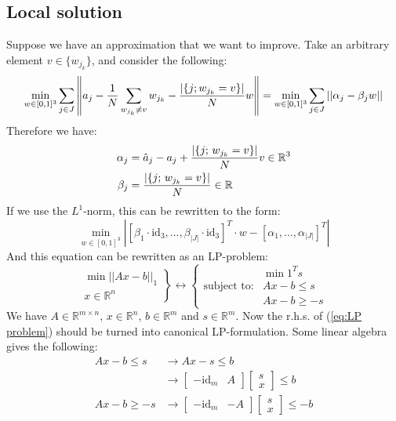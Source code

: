 \documentclass[10pt,a4paper]{article}
\newcommand{\R}{\mathbb{R}}
\newcommand{\id}{\text{id}}
\begin{document}
	\subsection*{Local solution}
	Suppose we have an approximation that we want to improve.
	Take an arbitrary element $v \in \{ w_{j_k} \}$, and consider the following:
	\begin{equation*}
	\min_{w \in [0,1]^3} \sum_{j \in J} \left\lVert a_j - {1 \over N} \sum_{w_{j_k} \neq v} w_{j_k} - {|\{j; w_{j_k} = v\}| \over N} w \right\rVert = \min_{w \in [0,1]^3} \sum_{j \in J} ||\alpha_j - \beta_j w||
	\end{equation*}
	Therefore we have:
	\begin{align*}
	\alpha_j &= \hat{a}_j - a_j + {|\{j; \, w_{j_k} = v \}| \over N}v \in \R^3\\
	\beta_j &= {|\{j; \, w_{j_k} = v \}| \over N} \in \R
	\end{align*}
	If we use the $L^1$-norm, this can be rewritten to the form:
	\begin{equation*}
	\min_{w \in [0,1]^3} |[\beta_1 \cdot \id_{3}, ..., \beta_{|J|} \cdot \id_{3}]^T \cdot w - [\alpha_1, ..., \alpha_{|J|}]^T|
	\end{equation*}
	And this equation can be rewritten as an LP-problem:
	\begin{equation}
	\left. \begin{matrix}
	\min ||Ax - b||_1\\
	x \in \R^n
	\end{matrix} \right\} 
	\longleftrightarrow 
	\left\{ \begin{matrix}
	&\min 1^T s\\
	\text{subject to:}& Ax - b \leq s\\
	&Ax-b \geq -s
	\end{matrix}\right.
	\label{eq:LP problem}
	\end{equation}
	We have $A \in \R^{m\times n}$, $x \in \R^n$, $b \in \R^m$ and $s \in \R^m$. 
	Now the r.h.s. of (\ref{eq:LP problem}) should be turned into canonical LP-formulation.
	Some linear algebra gives the following:
	\begin{align*}
	Ax - b \leq s &\longrightarrow Ax - s \leq b \\
	&\longrightarrow \begin{bmatrix}-\id_{m} & A\end{bmatrix} \begin{bmatrix}s\\ x\end{bmatrix} \leq b\\
	Ax - b \geq -s &\longrightarrow \begin{bmatrix}-\id_{m} & -A\end{bmatrix} \begin{bmatrix}s\\ x\end{bmatrix} \leq -b
	\end{align*}
\end{document}
